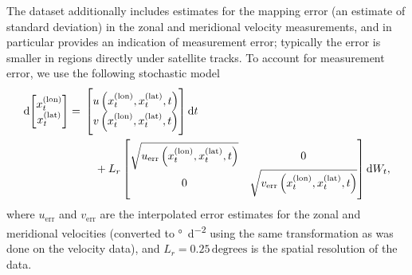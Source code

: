 The dataset additionally includes estimates for the mapping error (an estimate of standard deviation) in the zonal and meridional velocity measurements, and in particular provides an indication of measurement error; typically the error is smaller in regions directly under satellite tracks.
To account for measurement error, we use the following stochastic model
\begin{equation}
	\dif \begin{bmatrix}
		x^{(\mathrm{lon})}_t \\ x^{(\mathrm{lat})}_t
	\end{bmatrix} = \begin{multlined}[t]
		\begin{bmatrix} u\left(x^{(\mathrm{lon})}_t, x^{(\mathrm{lat})}_t, t\right) \\ v\left(x^{(\mathrm{lon})}_t, x^{(\mathrm{lat})}_t, t\right) \end{bmatrix}\dif t \\
		+ L_r\begin{bmatrix}
			\sqrt{u_{\mathrm{err}}\left(x^{(\mathrm{lon})}_t, x^{(\mathrm{lat})}_t, t\right)} & 0                                                                                 \\
			0                                                                                 & \sqrt{v_{\mathrm{err}}\left(x^{(\mathrm{lon})}_t, x^{(\mathrm{lat})}_t, t\right)}
		\end{bmatrix} \dif W_t,
	\end{multlined}
	\label{eqn:natl_sde}
\end{equation}
where \(u_{\mathrm{err}}\) and \(v_{\mathrm{err}}\) are the interpolated error estimates for the zonal and meridional velocities (converted to \unit{\degree\per\square\day} using the same transformation as was done on the velocity data), and \(L_r = 0.25 \mathrm{\,degrees}\) is the spatial resolution of the data.







